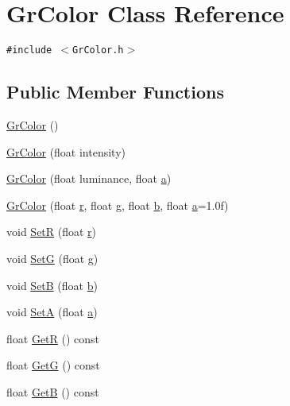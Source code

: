 \hypertarget{class_gr_color}{
\section{GrColor Class Reference}
\label{class_gr_color}
}
{\tt \#include $<$GrColor.h$>$}

\subsection*{Public Member Functions}
\begin{CompactItemize}
\item 
\hyperlink{class_gr_color_17afe5cf44819fde9b9303d6749c229e}{GrColor} ()
\item 
\hyperlink{class_gr_color_0dc264cb95a190125215e2e33ff673a1}{GrColor} (float intensity)
\item 
\hyperlink{class_gr_color_dcc77a569fe079c5fe1e199c7c08c03e}{GrColor} (float luminance, float \hyperlink{glext__bak_8h_3309789fc188587d666cda5ece79cf82}{a})
\item 
\hyperlink{class_gr_color_14158e777e2018dc6df18ea8711facbd}{GrColor} (float \hyperlink{glext__bak_8h_31034e24af8271ed8267858116fe2e48}{r}, float \hyperlink{glext__bak_8h_caceb3a655ff28b75259860bcb868f9f}{g}, float \hyperlink{glext__bak_8h_0f71581a41fd2264c8944126dabbd010}{b}, float \hyperlink{glext__bak_8h_3309789fc188587d666cda5ece79cf82}{a}=1.0f)
\item 
void \hyperlink{class_gr_color_4d973c54a9d67c7d61582c1454ae52e4}{SetR} (float \hyperlink{glext__bak_8h_31034e24af8271ed8267858116fe2e48}{r})
\item 
void \hyperlink{class_gr_color_0ffcc02bd3353035230813c5f2686e77}{SetG} (float \hyperlink{glext__bak_8h_caceb3a655ff28b75259860bcb868f9f}{g})
\item 
void \hyperlink{class_gr_color_71409afb6c4ac6765f1b92d80e25379e}{SetB} (float \hyperlink{glext__bak_8h_0f71581a41fd2264c8944126dabbd010}{b})
\item 
void \hyperlink{class_gr_color_160b009ce60dc997e554a0b82b4a238f}{SetA} (float \hyperlink{glext__bak_8h_3309789fc188587d666cda5ece79cf82}{a})
\item 
float \hyperlink{class_gr_color_2dfa131b3694f4643ebace7490e3a3a6}{GetR} () const 
\item 
float \hyperlink{class_gr_color_0d11096eccfbf065a7262f25d2e29c91}{GetG} () const 
\item 
float \hyperlink{class_gr_color_c273f31227f8cf2a7b70c491dc1fbe91}{GetB} () const 

\end{CompactItemize}
